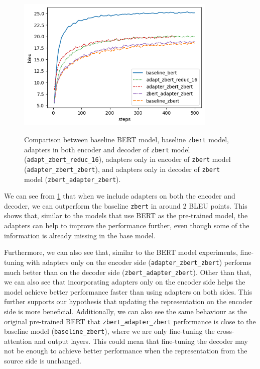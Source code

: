 \begin{figure}[h]
    {\includegraphics[width=0.85\textwidth]{img/zbert_pos.png}}
    \centering
    \caption[Comparison between baseline BERT and \texttt{zbert} models.]{Comparison between baseline BERT model, baseline \texttt{zbert} model, adapters in both encoder and decoder of \texttt{zbert} model (\texttt{adapt\_zbert\_reduc\_16}), adapters only in encoder of \texttt{zbert} model (\texttt{adapter\_zbert\_zbert}), and adapters only in decoder of \texttt{zbert} model (\texttt{zbert\_adapter\_zbert}).}
    \label{img:zbert_pos}
\end{figure}

We can see from \cref{img:zbert_pos} that when we include adapters on both the encoder and decoder, we can outperform the baseline \texttt{zbert} in around 2 BLEU points. This shows that, similar to the models that use BERT as the pre-trained model, the adapters can help to improve the performance further, even though some of the information is already missing in the base model.

Furthermore, we can also see that, similar to the BERT model experiments, fine-tuning with adapters only on the encoder side (\texttt{adapter\_zbert\_zbert}) performs much better than on the decoder side (\texttt{zbert\_adapter\_zbert}). Other than that, we can also see that incorporating adapters only on the encoder side helps the model achieve better performance faster than using adapters on both sides. This further supports our hypothesis that updating the representation on the encoder side is more beneficial. Additionally, we can also see the same behaviour as the original pre-trained BERT that \texttt{zbert\_adapter\_zbert} performance is close to the baseline model (\texttt{baseline\_zbert}), where we are only fine-tuning the cross-attention and output layers. This could mean that fine-tuning the decoder may not be enough to achieve better performance when the representation from the source side is unchanged.

